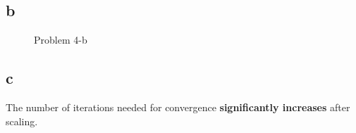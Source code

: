 \documentclass[a4paper,11pt]{article}
\theoremstyle{mytheor}
\begin{document}
\subsection*{b}
\begin{figure}[h]
	\caption{Problem 4-b}
\end{figure}

\subsection*{c}
The number of iterations needed for convergence \textbf{significantly increases} after scaling.
\end{document}
